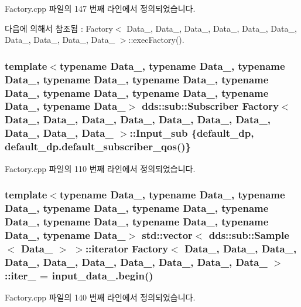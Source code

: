 Factory.\+cpp 파일의 147 번째 라인에서 정의되었습니다.



다음에 의해서 참조됨 \+:  Factory$<$ Data\+\_, Data\+\_, Data\+\_, Data\+\_, Data\+\_, Data\+\_, Data\+\_, Data\+\_, Data\+\_, Data\+\_ $>$\+::exec\+Factory().

\subsubsection[{\texorpdfstring{Input\+\_\+sub}{Input_sub}}]{\setlength{\rightskip}{0pt plus 5cm}template$<$typename Data\+\_, typename Data\+\_, typename Data\+\_, typename Data\+\_, typename Data\+\_, typename Data\+\_, typename Data\+\_, typename Data\+\_, typename Data\+\_, typename Data\+\_$>$ dds\+::sub\+::\+Subscriber {\bf Factory}$<$ Data\+\_, Data\+\_, Data\+\_, Data\+\_, Data\+\_, Data\+\_, Data\+\_, Data\+\_, Data\+\_, Data\+\_ $>$\+::Input\+\_\+sub \{{\bf default\+\_\+dp}, default\+\_\+dp.\+default\+\_\+subscriber\+\_\+qos()\}}\hypertarget{classFactory_a1c96bbf37ab7ad1775854d283298212a}{}\label{classFactory_a1c96bbf37ab7ad1775854d283298212a}


Factory.\+cpp 파일의 110 번째 라인에서 정의되었습니다.

\subsubsection[{\texorpdfstring{iter\+\_\+1}{iter_1}}]{\setlength{\rightskip}{0pt plus 5cm}template$<$typename Data\+\_, typename Data\+\_, typename Data\+\_, typename Data\+\_, typename Data\+\_, typename Data\+\_, typename Data\+\_, typename Data\+\_, typename Data\+\_, typename Data\+\_$>$ std\+::vector$<$ dds\+::sub\+::\+Sample$<$ Data\+\_ $>$ $>$\+::iterator {\bf Factory}$<$ Data\+\_, Data\+\_, Data\+\_, Data\+\_, Data\+\_, Data\+\_, Data\+\_, Data\+\_, Data\+\_, Data\+\_ $>$\+::iter\+\_ = input\+\_\+data\+\_.\+begin()}\hypertarget{classFactory_afe81300eda34ff9d60fc4f243b94534d}{}\label{classFactory_afe81300eda34ff9d60fc4f243b94534d}


Factory.\+cpp 파일의 140 번째 라인에서 정의되었습니다.



